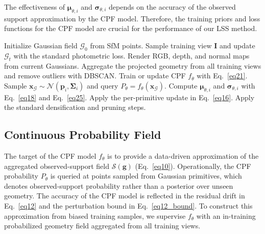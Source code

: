 \documentclass[lettersize,journal]{IEEEtran}
\begin{document}
The effectiveness of $\boldsymbol{\mu}_{\theta,i}$ and $\boldsymbol{\sigma}_{\theta,i}$ depends on the accuracy of the observed support approximation by the CPF model. Therefore, the training priors and loss functions for the CPF model are crucial for the performance of our LSS method.

\begin{algorithm}[t]
\caption{GS-LSS Training Procedure}
\label{alg:gslss}
\begin{algorithmic}[1]
\STATE Initialize Gaussian field $\mathcal{G}_0$ from SfM points.
    \STATE Sample training view $\mathbf{I}$ and update $\mathcal{G}_t$ with the standard photometric loss.
        \STATE Render RGB, depth, and normal maps from current Gaussians.
        \STATE Aggregate the projected geometry from all training views and remove outliers with DBSCAN.
        \STATE Train or update CPF $f_{\theta}$ with Eq.~\ref{eq21}.
    \ENDIF
            \STATE Sample $\mathbf{x}_{\mathcal{G}}\sim\mathcal{N}(\mathbf{p}_i,\mathbf{\Sigma}_i)$ and query $P_{\theta}=f_{\theta}(\mathbf{x}_{\mathcal{G}})$.
            \STATE Compute $\boldsymbol{\mu}_{\theta,i}$ and $\boldsymbol{\sigma}_{\theta,i}$ with Eq.~\ref{eq18} and Eq.~\ref{eq25}.
            \STATE Apply the per-primitive update in Eq.~\ref{eq16}.
        \ENDFOR
    \ENDIF
    \STATE Apply the standard densification and pruning steps.
\ENDFOR
\end{algorithmic}
\end{algorithm}

\subsection{Continuous Probability Field}\label{sec:cpf}

The target of the CPF model $f_{\theta}$ is to provide 
a data-driven approximation of the aggregated observed-support field $\mathcal{S}(\mathbf{g})$ (Eq.~\ref{eq10}).
{Operationally, the CPF probability $P_{\theta}$ is queried at points sampled from Gaussian primitives, which denotes observed-support probability rather than a posterior over unseen geometry.}
The accuracy of the CPF model is reflected in the residual drift in Eq.~\ref{eq12} and the perturbation bound in Eq.~\ref{eq12_bound}.
To construct this approximation from biased training samples, we supervise $f_{\theta}$ with an in-training probabilized geometry field aggregated from all training views.
\end{document}
